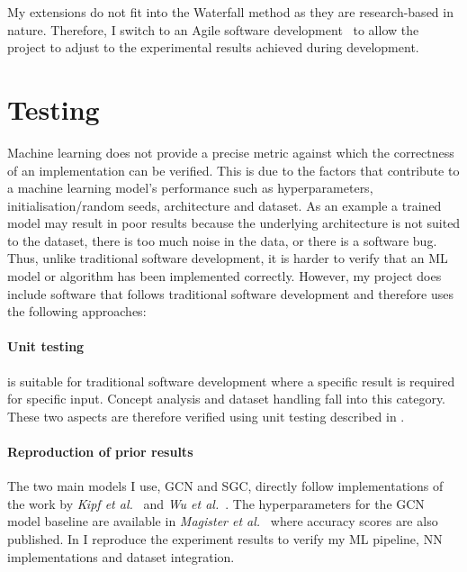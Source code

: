 My extensions do not fit into the Waterfall method as they are research-based in nature. Therefore, I switch to an Agile software development~\cite{beck2001manifesto} to allow the project to adjust to the experimental results achieved during development.

\section{Testing}
\label{sec:testing}


Machine learning does not provide a precise metric against which the correctness of an implementation can be verified.
This is due to the factors that contribute to a machine learning model's performance such as hyperparameters, initialisation/random seeds, architecture and dataset.
As an example a trained model may result in poor results because the underlying architecture is not suited to the dataset, there is too much noise in the data, or there is a software bug.
Thus, unlike traditional software development, it is harder to verify that an ML model or algorithm has been implemented correctly.
However, my project does include software that follows traditional software development and therefore uses the following approaches:

\paragraph{Unit testing}
is suitable for traditional software development where a specific result is required for specific input.
Concept analysis and dataset handling fall into this category.
These two aspects are therefore verified using unit testing described in .

\paragraph{Reproduction of prior results}
The two main models I use, GCN and SGC, directly follow implementations of the work by \textit{Kipf et al.}~\cite{kipf2016semi} and \textit{Wu et al.}~\cite{wu2019simplifying}.
The hyperparameters for the GCN model baseline are available in \textit{Magister et al.}~\cite{magister2021gcexplainer} where accuracy scores are also published.
In  I reproduce the experiment results to verify my ML pipeline, NN implementations and dataset integration.


